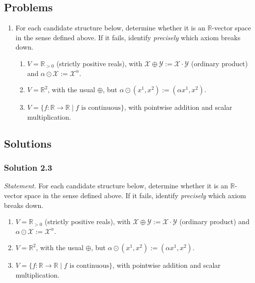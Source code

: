 \documentclass[11pt]{article}
\begin{document}
\subsection*{Problems}

\begin{enumerate}[label=\textbf{2.\arabic*}, leftmargin=2.2cm, start=3]

\item \label{prob:vspace-axioms}
For each candidate structure below, determine whether it is an $\mathbb{R}$-vector space in the sense defined above. If it fails, identify \emph{precisely} which axiom breaks down.
\begin{enumerate}[label=(\alph*)]
  \item $V = \mathbb{R}_{>0}$ (strictly positive reals), with $\mathcal{X} \oplus \mathcal{Y} := \mathcal{X}\cdot\mathcal{Y}$ (ordinary product) and $\alpha \odot \mathcal{X} := \mathcal{X}^{\alpha}$.
  \item $V = \mathbb{R}^2$, with the usual $\oplus$, but $\alpha \odot (x^1,x^2) := (\alpha x^1, x^2)$.
  \item $V = \{f : \mathbb{R} \to \mathbb{R} \mid f \text{ is continuous}\}$, with pointwise addition and scalar multiplication.
\end{enumerate}

\end{enumerate}

\subsection*{Solutions}

\subsubsection*{Solution 2.3}

\noindent\textit{Statement.} For each candidate structure below, determine whether it is an $\mathbb{R}$-vector space in the sense defined above. If it fails, identify \emph{precisely} which axiom breaks down.
\begin{enumerate}[label=(\alph*)]
  \item $V = \mathbb{R}_{>0}$ (strictly positive reals), with $\mathcal{X} \oplus \mathcal{Y} := \mathcal{X}\cdot\mathcal{Y}$ (ordinary product) and $\alpha \odot \mathcal{X} := \mathcal{X}^{\alpha}$.
  \item $V = \mathbb{R}^2$, with the usual $\oplus$, but $\alpha \odot (x^1,x^2) := (\alpha x^1, x^2)$.
  \item $V = \{f : \mathbb{R} \to \mathbb{R} \mid f \text{ is continuous}\}$, with pointwise addition and scalar multiplication.
\end{enumerate}
\end{document}
